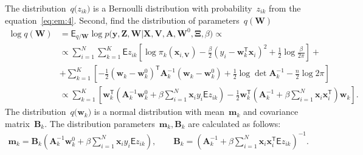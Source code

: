 \documentclass[12pt, twoside]{article}
\begin{document}
The distribution~$q\bigr(z_{ik}\bigr)$ is a Bernoulli distribution with probability~$z_{ik}$ from the equation~\eqref{eq:em:4}.
Second, find the distribution of parameters~$q\left(\textbf{W}\right)$
\[
\label{eq:em:5}
\begin{aligned}
\log q\left(\textbf{W}\right) &= \mathsf{E}_{q/\textbf{W}}\log p\bigr(\mathbf{y}, \mathbf{Z}, \mathbf{W}|\mathbf{X}, \mathbf{V}, \textbf{A}, \textbf{W}^{0}, \bm{\Xi}, \beta\bigr) \propto\\
&\propto \sum_{i=1}^{N}\sum_{k=1}^{K}\mathsf{E}z_{ik}\left[\log\pi_{k}\left(\textbf{x}_{i, \textbf{V}}\right) - \frac{\beta}{2}\left(y_{i} - \textbf{w}_{k}^{\mathsf{T}}\textbf{x}_{i}\right)^{2} + \frac{1}{2}\log\frac{\beta}{2\pi}\right] + \\
&+ \sum_{k=1}^{K}\left[-\frac{1}{2}\left(\textbf{w}_{k} - \textbf{w}_{k}^{0}\right)^{\mathsf{T}}\textbf{A}_{k}^{-1}\left(\textbf{w}_{k} - \textbf{w}_{k}^{0}\right) + \frac{1}{2}\log\det\textbf{A}^{-1}_{k} - \frac{n}{2}\log2\pi\right] \\
&\propto \sum_{k=1}^{K}\left[\textbf{w}_{k}^{\mathsf{T}}\left(\textbf{A}_{k}^{-1}\textbf{w}_{k}^{0}+\beta\sum_{i=1}^{N}\textbf{x}_{i}y_{i}\mathsf{E}z_{ik}\right)-\frac{1}{2}\textbf{w}_{k}^{\mathsf{T}}\left(\textbf{A}_{k}^{-1}+\beta\sum_{i=1}^{N}\textbf{x}_{i}\textbf{x}_{i}^{\mathsf{T}}\right)\textbf{w}_{k}\right].
\end{aligned}
\]
The distribution~$q\bigr(\mathbf{w}_{k}\bigr)$ is a normal distribution with mean~$\mathbf{m}_{k}$ and covariance matrix~$\mathbf{B}_k$. The distribution parameters~$\mathbf{m}_{k}, \mathbf{B}_k$ are calculated as follows:
\[
\label{eq:em:6}
\begin{aligned}
\mathbf{m}_{k} = \mathbf{B}_{k}\left(\mathbf{A}_{k}^{-1}\mathbf{w}_{k}^{0}+\beta\sum_{i=1}^{N}\mathbf{x}_{i}y_{i}\mathsf{E}z_{ik}\right), \qquad \mathbf{B}_{k} = \left(\mathbf{A}_{k}^{-1}+\beta\sum_{i=1}^{N}\mathbf{x}_{i}\mathbf{x}_{i}^{\mathsf{T}}\mathsf{E}z_{ik}\right)^{-1}.
\end{aligned}
\]
\end{document}
